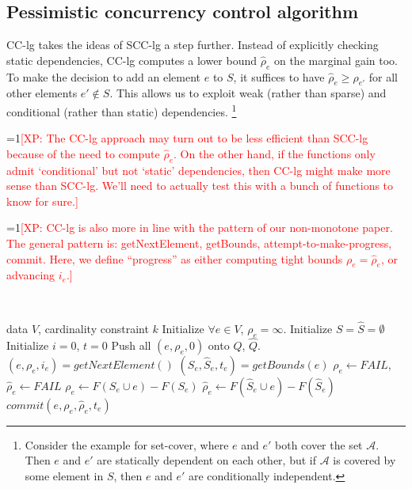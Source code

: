 \documentclass{article}
\newcommand{\Comments}{1}
\newcommand{\note}[2]{\ifnum\Comments=1\textcolor{#1}{#2}\fi}
\newcommand{\xinghao}[1]{\note{red}{[XP: #1]}}
\newcommand{\occlz}{SCC-lg}
\newcommand{\pcclz}{CC-lg}
\begin{document}
\subsection{Pessimistic concurrency control algorithm}
\pcclz{} takes the ideas of \occlz{} a step further.
Instead of explicitly checking static dependencies, \pcclz{} computes a lower bound $\widehat\rho_e$ on the marginal gain too.
To make the decision to add an element $e$ to $S$, it suffices to have $\widehat\rho_e \geq \rho_{e'}$ for all other elements $e' \not\in S$.
This allows us to exploit weak (rather than sparse) and conditional (rather than static) dependencies.
\footnote{
Consider the example for set-cover, where $e$ and $e'$ both cover the set $\mathcal{A}$.
Then $e$ and $e'$ are statically dependent on each other, but if $\mathcal{A}$ is covered by some element in $S$, then $e$ and $e'$ are conditionally independent.
}

\xinghao{The \pcclz{} approach may turn out to be less efficient than \occlz{} because of the need to compute $\widehat\rho_e$.
On the other hand, if the functions only admit `conditional' but not `static' dependencies, then \pcclz{} might make more sense than \occlz{}.
We'll need to actually test this with a bunch of functions to know for sure.}

\xinghao{\pcclz{} is also more in line with the pattern of our non-monotone paper.
The general pattern is: getNextElement, getBounds, attempt-to-make-progress, commit.
Here, we define ``progress'' as either computing tight bounds $\rho_e = \widehat\rho_e$, or advancing $i_e$.}

~

\begin{algorithm}[tb]
  \caption{Pessimistic CC Lazy Greedy}
  \label{alg:cclz}
\begin{algorithmic}[1]
   data $V$, cardinality constraint $k$
  \STATE Initialize $\forall e \in V$, $\rho_e = \infty$.
  \STATE Initialize $S = \widehat{S} = \emptyset$
  \STATE Initialize $i = 0$, $t = 0$
  \STATE Push all $(e, \rho_e, 0)$ onto $Q$, $\widehat{Q}$.
    \STATE $(e, \rho_e, i_e) = getNextElement()$
    \STATE $(S_e, \widehat{S}_e, t_e) = getBounds(e)$
      \STATE $\rho_e \leftarrow FAIL$, $\widehat\rho_e \leftarrow FAIL$
    \ELSE
      \STATE $\rho_e     \leftarrow F(S_e\cup e) - F(S_e)$
      \STATE $\widehat\rho_e \leftarrow F(\widehat{S}_e\cup e) - F(\widehat{S}_e)$
    \ENDIF
    \STATE $commit(e, \rho_e, \widehat\rho_e, t_e)$
  \ENDFOR
\end{algorithmic}
\end{algorithm}
\end{document}
